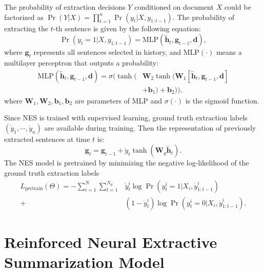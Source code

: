 \documentclass[letterpaper]{article} %
\begin{document}
	The probability of extraction decisions $Y$ conditioned on document $X$ could be factorized as $\Pr(Y|X) = \prod_{t=1}^{n} \Pr(y_t | X, y_{1:t-1})$.
	The probability of extracting the $t$-th sentence is given by the following equation:
	\begin{equation} \label{eq:mlp}
		 \Pr(y_t=1|X, y_{1:t-1}) = \text{MLP}(\overleftrightarrow{\mathbf{h}}_t, \mathbf{g}_{t-1}, \mathbf{d} ) ,
	\end{equation}
	where $\mathbf{g}_t$ represents all sentences selected in history, and $\text{MLP}(\cdot)$ means a multilayer perceptron that outputs a probability:
	\begin{align*}
	\text{MLP}(\overleftrightarrow{\mathbf{h}}_t, \mathbf{g}_{t-1}, \mathbf{d} ) =  \sigma( \tanh ( & \mathbf{W}_2 \tanh(\mathbf{W}_1 [\overleftrightarrow{\mathbf{h}}_t, \mathbf{g}_{t-1}, \mathbf{d}] \\
	& + \mathbf{b}_1) + \mathbf{b}_2) ),
	\end{align*}
	where $\mathbf{W}_{1},\mathbf{W}_{2}, \mathbf{b}_{1}, \mathbf{b}_{2}$ are parameters of MLP and $\sigma(\cdot)$ is the sigmoid function. 
	
	Since NES is trained with supervised learning, ground truth extraction labels $(\mathring{y}_1, \cdots, \mathring{y}_n)$ are available during training. Then the representation of previously extracted sentences at time $t$ is:
	\begin{equation}
	\mathbf{g}_t =  \mathbf{g}_{t-1} + \mathring{y}_t \tanh (\mathbf{W}_{g} \overleftrightarrow{\mathbf{h}}_t)  .
	\end{equation}
	The NES model is pretrained by minimizing the negative log-likelihood of the ground truth extraction labels
	\begin{align*}
	L_{\text{pretrain}}(\Theta) = - \sum_{i=1}^{N} \sum_{t=1}^{N_d} & \mathring{y}_t^i \log \Pr(y_t^i=1|X_i, \mathring{y}_{1:t-1}^i)\\ 
	 + & (1 - \mathring{y}_t^i) \log \Pr(y_t^i=0|X_i, \mathring{y}_{1:t-1}^i) .
	\end{align*}
	
	\section{Reinforced Neural Extractive Summarization Model}
	\label{sec:rl}
    
\end{document}
